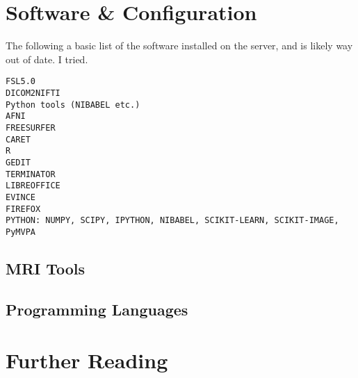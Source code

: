 \documentclass[final,titlepage,letterpaper,oneside,12pt]{article}
\begin{document}
\section{Software \& Configuration}

The following a basic list of the software installed on the server, and is likely way out of date. I tried.

\noindent
\texttt{FSL5.0 \\
DICOM2NIFTI \\
Python tools (NIBABEL etc.) \\
AFNI \\
FREESURFER \\
CARET \\
R \\
GEDIT \\
TERMINATOR \\
LIBREOFFICE \\
EVINCE \\
FIREFOX \\
PYTHON: NUMPY, SCIPY, IPYTHON, NIBABEL, SCIKIT-LEARN, SCIKIT-IMAGE, PyMVPA \\
}

\subsection{MRI Tools}
\subsection{Programming Languages}
\section{Further Reading}

\newpage 


\end{document}
